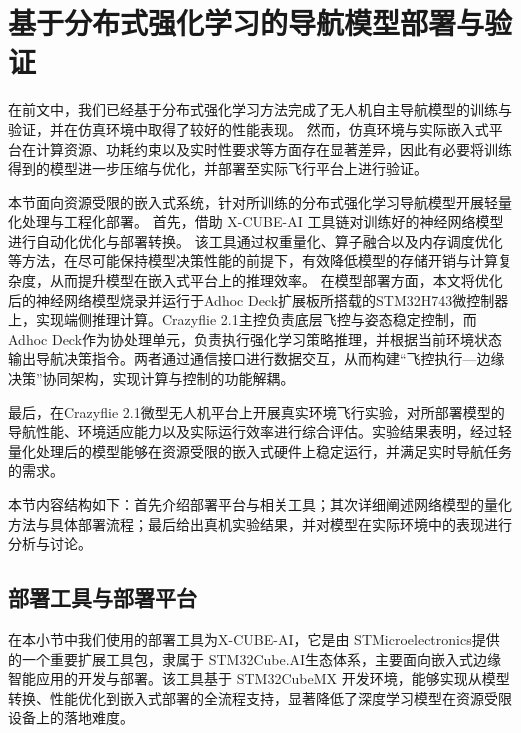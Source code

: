 \section{基于分布式强化学习的导航模型部署与验证}
在前文中，我们已经基于分布式强化学习方法完成了无人机自主导航模型的训练与验证，并在仿真环境中取得了较好的性能表现。
然而，仿真环境与实际嵌入式平台在计算资源、功耗约束以及实时性要求等方面存在显著差异，因此有必要将训练得到的模型进一步压缩与优化，并部署至实际飞行平台上进行验证。

本节面向资源受限的嵌入式系统，针对所训练的分布式强化学习导航模型开展轻量化处理与工程化部署。
首先，借助 X-CUBE-AI 工具链对训练好的神经网络模型进行自动化优化与部署转换。
该工具通过权重量化、算子融合以及内存调度优化等方法，在尽可能保持模型决策性能的前提下，有效降低模型的存储开销与计算复杂度，从而提升模型在嵌入式平台上的推理效率。
在模型部署方面，本文将优化后的神经网络模型烧录并运行于Adhoc Deck扩展板所搭载的STM32H743微控制器上，实现端侧推理计算。Crazyflie 2.1主控负责底层飞控与姿态稳定控制，而Adhoc Deck作为协处理单元，负责执行强化学习策略推理，并根据当前环境状态输出导航决策指令。两者通过通信接口进行数据交互，从而构建“飞控执行—边缘决策”协同架构，实现计算与控制的功能解耦。

最后，在Crazyflie 2.1微型无人机平台上开展真实环境飞行实验，对所部署模型的导航性能、环境适应能力以及实际运行效率进行综合评估。实验结果表明，经过轻量化处理后的模型能够在资源受限的嵌入式硬件上稳定运行，并满足实时导航任务的需求。

本节内容结构如下：首先介绍部署平台与相关工具；其次详细阐述网络模型的量化方法与具体部署流程；最后给出真机实验结果，并对模型在实际环境中的表现进行分析与讨论。
\subsection{部署工具与部署平台}
在本小节中我们使用的部署工具为X-CUBE-AI，它是由 STMicroelectronics提供的一个重要扩展工具包，隶属于 STM32Cube.AI生态体系，主要面向嵌入式边缘智能应用的开发与部署。该工具基于 STM32CubeMX 开发环境，能够实现从模型转换、性能优化到嵌入式部署的全流程支持，显著降低了深度学习模型在资源受限设备上的落地难度。

